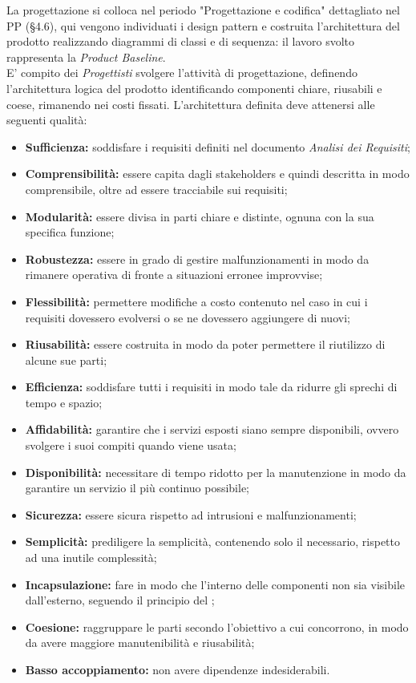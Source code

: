 \documentclass[../NomeDocumento.tex]{subfiles}
\begin{document}
	La progettazione si colloca nel periodo "Progettazione e codifica" dettagliato nel PP (§4.6), qui vengono individuati i design pattern e costruita l'architettura del prodotto realizzando diagrammi di classi e di sequenza: il lavoro svolto rappresenta la \textit{Product Baseline}. \\
	E' compito dei \textit{Progettisti} svolgere l'attività di progettazione, definendo l'architettura logica del prodotto identificando componenti chiare, riusabili e coese, rimanendo nei costi fissati. L'architettura definita deve attenersi alle seguenti qualità:
	\begin{itemize}
		\item \textbf{Sufficienza:} soddisfare i requisiti definiti nel documento \textit{Analisi dei Requisiti};
		\item \textbf{Comprensibilità:} essere capita dagli stakeholders e quindi descritta in modo comprensibile, oltre ad essere tracciabile sui requisiti;
		\item \textbf{Modularità:} essere divisa in parti chiare e distinte, ognuna con la sua specifica funzione;
		\item \textbf{Robustezza:} essere in grado di gestire malfunzionamenti in modo da rimanere operativa di fronte a situazioni erronee improvvise;
		\item \textbf{Flessibilità:} permettere modifiche a costo contenuto nel caso in cui i requisiti dovessero evolversi o se ne dovessero aggiungere di nuovi;
		\item \textbf{Riusabilità:} essere costruita in modo da poter permettere il riutilizzo di alcune sue parti;
		\item \textbf{Efficienza:} soddisfare tutti i requisiti in modo tale da ridurre gli sprechi di tempo e spazio;
		\item \textbf{Affidabilità:} garantire che i servizi esposti siano sempre disponibili, ovvero svolgere i suoi compiti quando viene usata;
		\item \textbf{Disponibilità:} necessitare di tempo ridotto per la manutenzione in modo da garantire un servizio il più continuo possibile;
		\item \textbf{Sicurezza:} essere sicura rispetto ad intrusioni e malfunzionamenti;
		\item \textbf{Semplicità:} prediligere la semplicità, contenendo solo il necessario, rispetto ad una inutile complessità;
		\item \textbf{Incapsulazione:} fare in modo che l'interno delle componenti non sia visibile dall'esterno, seguendo il principio del ;
		\item \textbf{Coesione:} raggruppare le parti secondo l'obiettivo a cui concorrono, in modo da avere maggiore manutenibilità e riusabilità;
		\item \textbf{Basso accoppiamento:} non avere dipendenze indesiderabili.
	\end{itemize}
	
\end{document}
